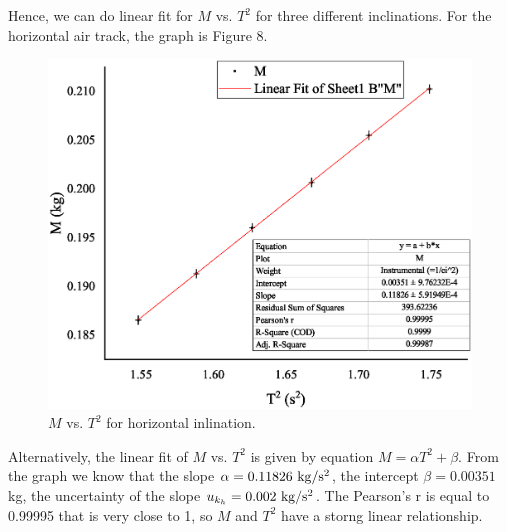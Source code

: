 \documentclass[a4paper]{report}
\begin{document}
	Hence, we can do linear fit for $M$ vs. $T^2$ for three different inclinations. For the horizontal air track, the graph is Figure 8.
	\begin{figure}[H]
		\centering
		\includegraphics[width=1\linewidth]{8.eps}
		\caption{$M$ vs. $T^2$ for horizontal inlination.}
	\end{figure}
	Alternatively, the linear fit of $M$ vs. $T^2$ is given by equation $M=\alpha T^2+\beta$. From the graph we know that the slope $\alpha=0.11826\ \rm{kg/s^2}$, the intercept $\beta=0.00351$ kg, the uncertainty of the slope $u_{k_h}=0.002\ \rm{kg/s^2}$. The Pearson's r is equal to 0.99995 that is very close to 1, so $M$ and $T^2$ have a storng linear relationship.
	
\end{document}
